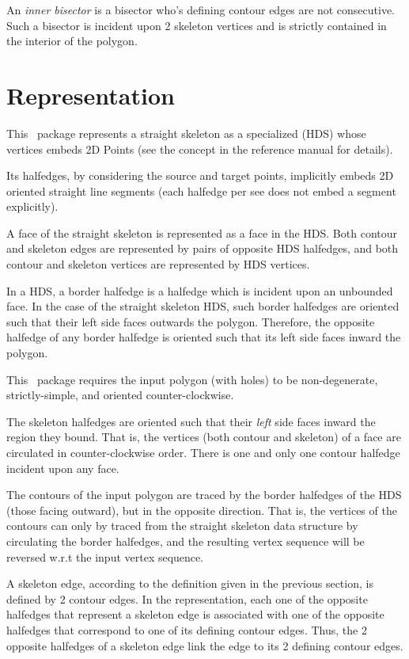 An {\em inner bisector} is a bisector who's defining contour edges are
not consecutive. Such a bisector is incident upon 2 skeleton vertices
and is strictly contained in the interior of the polygon.

\section{Representation}

This \cgal\ package represents a straight skeleton as a specialized  (HDS) whose vertices embeds 2D Points (see the  concept in the reference manual for details).

Its halfedges, by considering the source and target points, implicitly embeds 2D oriented straight line segments (each halfedge per see does not embed a segment explicitly).

A face of the straight skeleton is represented as a face in the
HDS. Both contour and skeleton edges are represented by pairs of
opposite HDS halfedges, and both contour and skeleton vertices are
represented by HDS vertices.

In a HDS, a border halfedge is a halfedge which is incident upon an
unbounded face. In the case of the straight skeleton HDS, such border
halfedges are oriented such that their left side faces outwards the
polygon. Therefore, the opposite halfedge of any border halfedge is
oriented such that its left side faces inward the polygon.

This \cgal\ package requires the input polygon (with holes) to be non-degenerate,
strictly-simple, and oriented counter-clockwise.

The skeleton halfedges are oriented such that their \textit{left} side faces
inward the region they bound. That is, the vertices (both contour and
skeleton) of a face are circulated in counter-clockwise order. There
is one and only one contour halfedge incident upon any face.

The contours of the input polygon are traced by the border halfedges 
of the HDS (those facing outward), but in the opposite direction. That 
is, the vertices of the contours can only by traced from the straight
skeleton data structure by circulating the border halfedges,
and the resulting vertex sequence will be reversed w.r.t 
the input vertex sequence.

A skeleton edge, according to the definition given in the previous
section, is defined by 2 contour edges. In the representation, each
one of the opposite halfedges that represent a skeleton edge is
associated with one of the opposite halfedges that correspond to one
of its defining contour edges. Thus, the 2 opposite halfedges of a
skeleton edge link the edge to its 2 defining contour edges.

